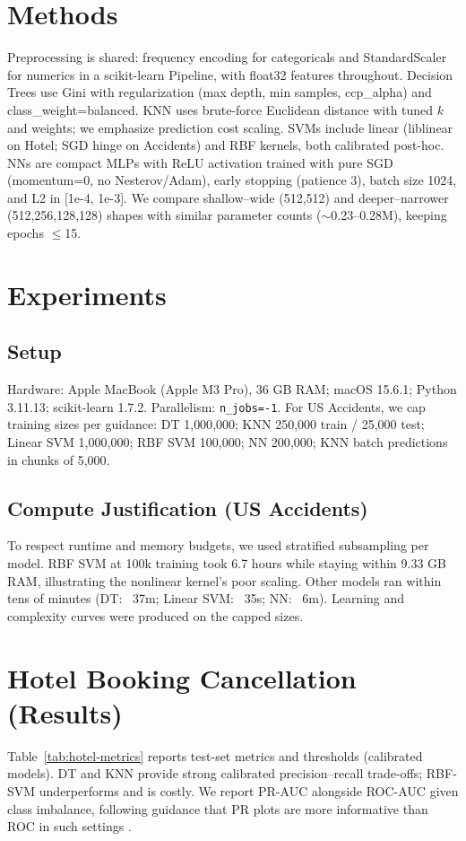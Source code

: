 \documentclass[conference]{IEEEtran}
\newcommand{\datasetA}{Hotel Booking Cancellation}
\newcommand{\datasetB}{US Accidents}
\begin{document}
\section{Methods}
Preprocessing is shared: frequency encoding for categoricals and StandardScaler for numerics in a scikit-learn Pipeline, with float32 features throughout. Decision Trees use Gini with regularization (max depth, min samples, ccp\_alpha) and class\_weight=balanced. KNN uses brute-force Euclidean distance with tuned $k$ and weights; we emphasize prediction cost scaling. SVMs include linear (liblinear on Hotel; SGD hinge on Accidents) and RBF kernels, both calibrated post-hoc. NNs are compact MLPs with ReLU activation trained with pure SGD (momentum=0, no Nesterov/Adam), early stopping (patience 3), batch size 1024, and L2 in [1e-4, 1e-3]. We compare shallow–wide (512,512) and deeper–narrower (512,256,128,128) shapes with similar parameter counts ($\sim$0.23–0.28M), keeping epochs $\leq$15.

\section{Experiments}
\subsection{Setup}
Hardware: Apple MacBook (Apple M3 Pro), 36 GB RAM; macOS 15.6.1; Python 3.11.13; scikit-learn 1.7.2. Parallelism: \texttt{n\_jobs=-1}. For \datasetB{}, we cap training sizes per guidance: DT 1{,}000{,}000; KNN 250{,}000 train / 25{,}000 test; Linear SVM 1{,}000{,}000; RBF SVM 100{,}000; NN 200{,}000; KNN batch predictions in chunks of 5{,}000.

\subsection{Compute Justification (\datasetB)}
To respect runtime and memory budgets, we used stratified subsampling per model. RBF SVM at 100k training took 6.7 hours while staying within 9.33 GB RAM, illustrating the nonlinear kernel's poor scaling. Other models ran within tens of minutes (DT: ~37m; Linear SVM: ~35s; NN: ~6m). Learning and complexity curves were produced on the capped sizes.

\section{\datasetA{} (Results)}
Table~\ref{tab:hotel-metrics} reports test-set metrics and thresholds (calibrated models). DT and KNN provide strong calibrated precision–recall trade-offs; RBF-SVM underperforms and is costly. We report PR-AUC alongside ROC-AUC given class imbalance, following guidance that PR plots are more informative than ROC in such settings \cite{Saito2015PRvsROC}.
\end{document}
